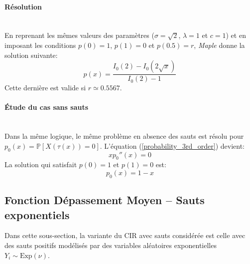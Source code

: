 \paragraph{Résolution}\phantom{}\\
En reprenant les mêmes valeurs des paramètres ($\sigma=\sqrt{2}$, $\lambda=1$ et $c=1$) et en imposant les conditions $p(0)=1$, $p(1)=0$ et $p(0.5)=r$, \textit{Maple} donne la solution suivante:
\begin{equation}\label{sol_probability_with_jumps}
    p(x)=\frac{I_0(2)-I_0(2\sqrt{x})}{I_0(2)-1}
\end{equation}
Cette dernière est valide si $r\simeq0.5567$.
\paragraph{Étude du cas sans sauts}\phantom{}\\
Dans la même logique, le même problème en absence des sauts est résolu pour $p_0(x)=\mathds{P}[X(\tau(x))=0]$. L'équation (\ref{probability_3rd_order}) devient:
\[
xp_0''(x)=0
\]
La solution qui satisfait $p(0)=1$ et $p(1)=0$ est:
\begin{equation}\label{sol_probability}
    p_0(x)=1-x
\end{equation}

\subsection{Fonction Dépassement Moyen -- Sauts exponentiels}
Dans cette sous-section, la variante du \ac{CIR} avec sauts considérée est celle avec des sauts positifs modélisés par des variables aléatoires exponentielles $Y_i\sim \text{Exp}(\nu)$.

